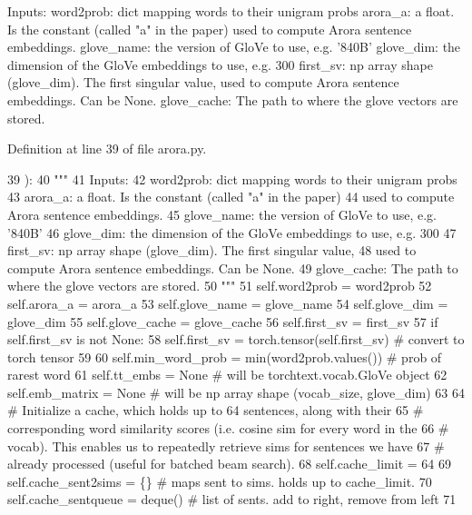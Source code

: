 \begin{DoxyVerb}  Inputs:
    word2prob: dict mapping words to their unigram probs
    arora_a: a float. Is the constant (called "a" in the paper)
      used to compute Arora sentence embeddings.
    glove_name: the version of GloVe to use, e.g. '840B'
    glove_dim: the dimension of the GloVe embeddings to use, e.g. 300
    first_sv: np array shape (glove_dim). The first singular value,
      used to compute Arora sentence embeddings. Can be None.
    glove_cache: The path to where the glove vectors are stored.
\end{DoxyVerb}
 

Definition at line 39 of file arora.\+py.


\begin{DoxyCode}
39     ):
40         \textcolor{stringliteral}{"""}
41 \textcolor{stringliteral}{          Inputs:}
42 \textcolor{stringliteral}{            word2prob: dict mapping words to their unigram probs}
43 \textcolor{stringliteral}{            arora\_a: a float. Is the constant (called "a" in the paper)}
44 \textcolor{stringliteral}{              used to compute Arora sentence embeddings.}
45 \textcolor{stringliteral}{            glove\_name: the version of GloVe to use, e.g. '840B'}
46 \textcolor{stringliteral}{            glove\_dim: the dimension of the GloVe embeddings to use, e.g. 300}
47 \textcolor{stringliteral}{            first\_sv: np array shape (glove\_dim). The first singular value,}
48 \textcolor{stringliteral}{              used to compute Arora sentence embeddings. Can be None.}
49 \textcolor{stringliteral}{            glove\_cache: The path to where the glove vectors are stored.}
50 \textcolor{stringliteral}{        """}
51         self.word2prob = word2prob
52         self.arora\_a = arora\_a
53         self.glove\_name = glove\_name
54         self.glove\_dim = glove\_dim
55         self.glove\_cache = glove\_cache
56         self.first\_sv = first\_sv
57         \textcolor{keywordflow}{if} self.first\_sv \textcolor{keywordflow}{is} \textcolor{keywordflow}{not} \textcolor{keywordtype}{None}:
58             self.first\_sv = torch.tensor(self.first\_sv)  \textcolor{comment}{# convert to torch tensor}
59 
60         self.min\_word\_prob = min(word2prob.values())  \textcolor{comment}{# prob of rarest word}
61         self.tt\_embs = \textcolor{keywordtype}{None}  \textcolor{comment}{# will be torchtext.vocab.GloVe object}
62         self.emb\_matrix = \textcolor{keywordtype}{None}  \textcolor{comment}{# will be np array shape (vocab\_size, glove\_dim)}
63 
64         \textcolor{comment}{# Initialize a cache, which holds up to 64 sentences, along with their}
65         \textcolor{comment}{# corresponding word similarity scores (i.e. cosine sim for every word in the}
66         \textcolor{comment}{# vocab). This enables us to repeatedly retrieve sims for sentences we have}
67         \textcolor{comment}{# already processed (useful for batched beam search).}
68         self.cache\_limit = 64
69         self.cache\_sent2sims = \{\}  \textcolor{comment}{# maps sent to sims. holds up to cache\_limit.}
70         self.cache\_sentqueue = deque()  \textcolor{comment}{# list of sents. add to right, remove from left}
71 
\end{DoxyCode}



